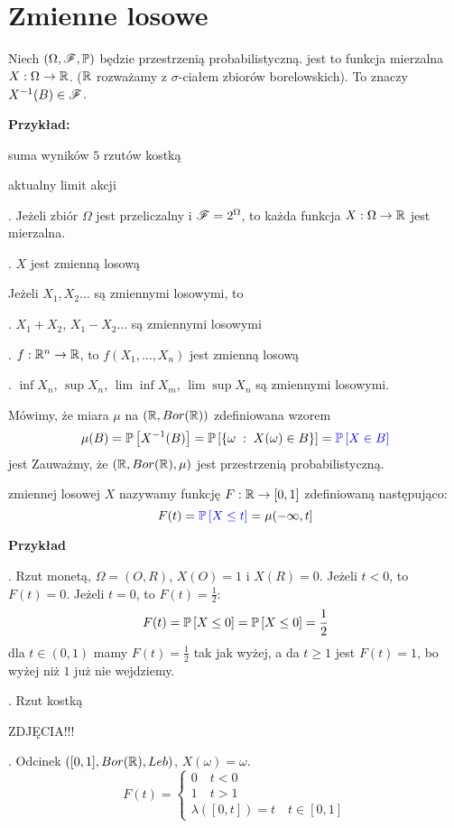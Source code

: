 \section{Zmienne losowe}

Niech $(\Omega,\mathcal{F},\mathbb{P})$ będzie przestrzenią probabilistyczną.  jest to funkcja mierzalna $X:\Omega\to\mathbb{R}$. ($\mathbb{R}$ rozważamy z $\sigma$-ciałem zbiorów borelowskich). To znaczy $X^{-1}(B)\in \mathcal{F}$.

\textbf{Przykład:}

\indent \point suma wyników $5$ rzutów kostką

\indent \point aktualny limit akcji


. Jeżeli zbiór $\Omega$ jest przeliczalny i $\mathcal{F}=2^{\Omega}$, to każda funkcja $X:\Omega\to\mathbb{R}$ jest mierzalna.

. $X$ jest zmienną losową
\medskip

 Jeżeli $X_1, X_2...$ są zmiennymi losowymi, to

. $X_1+X_2$, $X_1-X_2$... są zmiennymi losowymi

. $f:\mathbb{R}^n\to \mathbb{R}$, to $f(X_1,...,X_n)$ jest zmienną losową

. $\inf X_n$, $\sup X_n$, $\lim\inf X_m$, $\lim\sup X_n$ są zmiennymi losowymi.
\medskip

Mówimy, że miara $\mu$ na $(\mathbb{R},Bor(\mathbb{R}))$ zdefiniowana wzorem
$$\mu(B)=\mathbb{P}\left[X^{-1}(B)\right]=\mathbb{P}\left[\{\omega\;:\;X(\omega)\in B\}\right]={\color{blue}\mathbb{P}\left[X\in B\right]}$$
jest  Zauważmy, że $(\mathbb{R},Bor(\mathbb{R}),\mu)$ jest przestrzenią probabilistyczną.

 zmiennej losowej $X$ nazywamy funkcję $F:\mathbb{R}\to[0,1]$ zdefiniowaną następująco:
$$F(t)={\color{blue}\mathbb{P}\left[X\leq t\right]}=\mu{(-\infty,t]}$$

\textbf{Przykład}

. Rzut monetą, $\Omega=(O, R)$, $X(O)=1$ i $X(R)=0$. Jeżeli $t<0$, to $F(t)=0$. Jeżeli $t=0$, to $F(t)=\frac12$:
$$F(t)=\mathbb{P}\left[X\leq0\right]=\mathbb{P}\left[X\leq 0\right]=\frac12$$
dla $t\in (0, 1)$ mamy $F(t)=\frac12$ tak jak wyżej, a da $t\geq 1$ jest $F(t)=1$, bo wyżej niż $1$ już nie wejdziemy.

. Rzut kostką

{\large\color{orange}ZDJĘCIA!!!}

. Odcinek $([0,1], Bor(\mathbb{R}), Leb)$, $X(\omega)=\omega$.
$$F(t)=\begin{cases}
    0\quad t<0\\
    1\quad t>1\\
    \lambda([0,t])=t \quad t\in[0, 1]
\end{cases}$$

